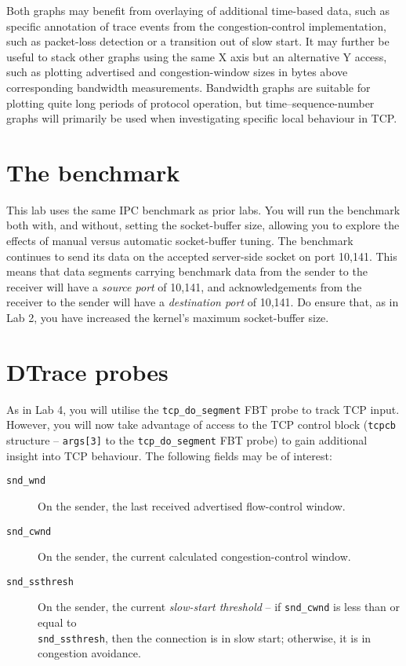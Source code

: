 \documentclass[a4paper,10pt]{article}
\begin{document}
Both graphs may benefit from overlaying of additional time-based data, such as
specific annotation of trace events from the congestion-control
implementation, such as packet-loss detection or a transition out of slow
start.
It may further be useful to stack other graphs using the same X axis but an
alternative Y access, such as plotting advertised and congestion-window sizes
in bytes above corresponding bandwidth measurements.
Bandwidth graphs are suitable for plotting quite long periods of protocol
operation, but time--sequence-number graphs will primarily be used when
investigating specific local behaviour in TCP.

\section*{The benchmark}

This lab uses the same IPC benchmark as prior labs.
You will run the benchmark both with, and without, setting the socket-buffer
size, allowing you to explore the effects of manual versus automatic
socket-buffer tuning.
The benchmark continues to send its data on the accepted server-side socket on
port 10,141.
This means that data segments carrying benchmark data from the sender to the
receiver will have a \textit{source port} of 10,141, and acknowledgements from
the receiver to the sender will have a \textit{destination port} of 10,141.
Do ensure that, as in Lab 2, you have increased the kernel's maximum 
socket-buffer size.

\section*{DTrace probes}

As in Lab 4, you will utilise the \texttt{tcp\_do\_segment} FBT probe to track
TCP input.
However, you will now take advantage of access to the TCP control block
(\texttt{tcpcb} structure -- \texttt{args[3]} to the \texttt{tcp\_do\_segment}
FBT probe) to gain additional insight into TCP behaviour.
The following fields may be of interest:

\begin{description}
\item[\texttt{snd\_wnd}] On the sender, the last received advertised
  flow-control window.
\item[\texttt{snd\_cwnd}] On the sender, the current calculated
  congestion-control window.
\item[\texttt{snd\_ssthresh}] On the sender, the current \textit{slow-start
  threshold} -- if \texttt{snd\_cwnd} is less than or equal to \\
  \texttt{snd\_ssthresh},
  then the connection is in slow start; otherwise, it is in congestion
  avoidance.
\end{description}
\end{document}
